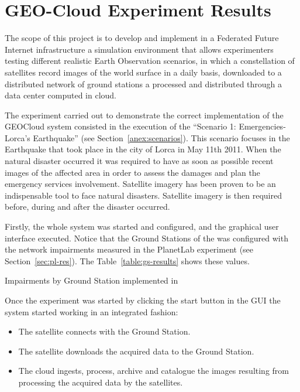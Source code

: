 \section{GEO-Cloud Experiment Results}
\label{sec:geocloud-results}

The scope of this project is to develop and implement in a Federated Future
Internet infrastructure a simulation environment that allows experimenters
testing different realistic Earth Observation scenarios, in which a
constellation of satellites record images of the world surface in a daily basis,
downloaded to a distributed network of ground stations a processed and
distributed through a data center computed in cloud.

The experiment carried out to demonstrate the correct implementation of the
GEOCloud system consisted in the execution of the ``Scenario 1: Emergencies-Lorca’s Earthquake'' (see Section~\ref{anex:scenarios}). This scenario focuses in the Earthquake that
took place in the city of Lorca in May 11th 2011. When the natural disaster occurred
it was required to have as soon as possible recent images of the affected area in
order to assess the damages and plan the emergency services
involvement. Satellite imagery has been proven to be an indispensable tool to
face natural disasters. Satellite imagery is then required before, during and
after the disaster occurred. 

Firstly, the whole system was started and configured, and the graphical user
interface executed. Notice that the Ground Stations of the \sss was configured with
the network impairments measured in the PlanetLab experiment (see
Section~\ref{sec:pl-res}). The Table~\ref{table:gs-results} shows these values.

\begin{table}[!h]
  \centering
  {\small
  
  }
  \caption{Impairments by Ground Station implemented in \vw}
  \label{table:gs-results}
\end{table}



Once the experiment was started by clicking the start button in the \ac{GUI} the system started working in an integrated fashion:
\begin{itemize}
\item The satellite connects with the Ground Station.
\item The satellite downloads the acquired data to the Ground Station.
\item The cloud ingests, process, archive and catalogue the images resulting
  from processing the acquired data by the satellites.
\end{itemize}


